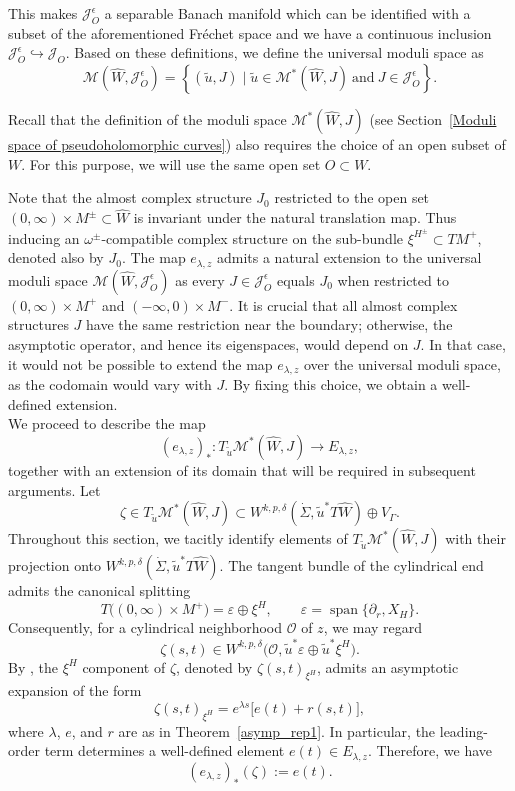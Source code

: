 \documentclass[11pt, a4paper]{amsart}
\newcommand{\cJ}{\mathcal{J}}
\newcommand{\cM}{\mathcal{M}}
\begin{document}
This makes $\cJ_O^{\epsilon}$ a separable Banach manifold which can be identified with a subset of the aforementioned Fr\'echet space and we have a continuous inclusion $\cJ^{\epsilon}_O \hookrightarrow \cJ_O$. Based on these definitions, we define the universal moduli space as $$\cM(\widehat{W},\cJ^{\epsilon}_O) =\left\{ (\tilde{u},J) \mid \tilde{u} \in \cM^*(\widehat{W},J) \mathrm{\ and \ } J\in \cJ^{\epsilon}_O \right\}.$$ 

Recall that the definition of the moduli space $\mathcal{M}^*(\widehat{W},J)$ (see Section~\ref{Moduli space of pseudoholomorphic curves}) also requires the choice of an open subset of $W$. For this purpose, we will use the same open set $O \subset W$.

Note that the almost complex structure $J_{0}$ restricted to the open set  ${(0,\infty)\times M^{\pm}}\subset\widehat{W}$ is invariant under the natural translation map. Thus inducing an $\omega^{\pm}$-compatible complex structure on the sub-bundle $\xi^{H^{\pm}}\subset TM^{+}$, denoted also by $J_{0}$. The map $e_{\lambda,z}$ admits a natural extension to the universal moduli space $\cM(\widehat{W},\cJ^{\epsilon}_O)$ as every $J\in \cJ^{\epsilon}_O$ equals $J_{0}$ when restricted to ${(0,\infty)\times M^+}$ and $(-\infty, 0)\times M^-$. It is crucial that all almost complex structures $J$ have the same restriction near the boundary; otherwise, the asymptotic operator, and hence its eigenspaces, would depend on $J$. In that case, it would not be possible to extend the map $e_{\lambda,z}$ over the universal moduli space, as the codomain would vary with $J$. By fixing this choice, we obtain a well-defined extension.\\

We proceed to describe the map 
\[
(e_{\lambda,z})_*: T_{\tilde{u}}\mathcal{M}^*(\widehat{W},J) \to E_{\lambda,z},
\]
together with an extension of its domain that will be required in subsequent arguments. Let 
\[
\zeta \in T_{\tilde{u}}\mathcal{M}^*(\widehat{W},J) \subset W^{k,p,\delta}\!\left(\dot{\Sigma}, \tilde{u}^*T\widehat{W}\right) \oplus V_{\Gamma}.
\]
Throughout this section, we tacitly identify elements of $T_{\tilde{u}}\mathcal{M}^*(\widehat{W},J)$ with their projection onto $W^{k,p,\delta}(\dot{\Sigma}, \tilde{u}^*T\widehat{W})$. The tangent bundle of the cylindrical end admits the canonical splitting
\[
T\big((0,\infty)\times M^+\big)=\varepsilon \oplus \xi^H,
\qquad \varepsilon=\operatorname{span}\{\partial_r, X_H\}.
\]
Consequently, for a cylindrical neighborhood $\mathcal{O}$ of $z$, we may regard
\[
\zeta(s,t) \in W^{k,p,\delta}\big(\mathcal{O}, \tilde{u}^*\varepsilon \oplus \tilde{u}^*\xi^H\big).
\]
By \cite[Theorem~A.1]{Siefinter2008}, the $\xi^H$ component of $\zeta$, denoted by $\zeta(s,t)_{\xi^H}$, admits an asymptotic expansion of the form
\[
\zeta(s,t)_{\xi^H}=e^{\lambda s}\big[e(t)+r(s,t)\big],
\]
where $\lambda$, $e$, and $r$ are as in Theorem~\ref{asymp_rep1}. In particular, the leading-order term determines a well-defined element $e(t)\in E_{\lambda,z}$. Therefore, we have
\[
(e_{\lambda,z})_*(\zeta) := e(t).
\]
\end{document}
